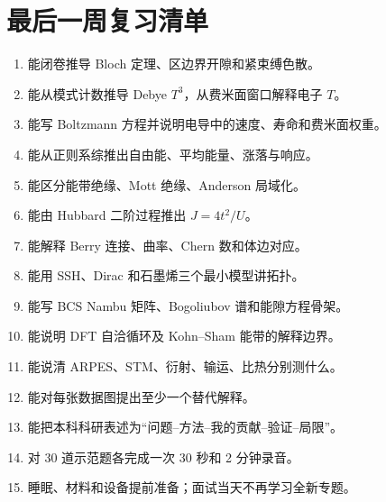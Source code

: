\chapter{最后一周复习清单}
\begin{enumerate}
\item 能闭卷推导 Bloch 定理、区边界开隙和紧束缚色散。
\item 能从模式计数推导 Debye $T^3$，从费米面窗口解释电子 $T$。
\item 能写 Boltzmann 方程并说明电导中的速度、寿命和费米面权重。
\item 能从正则系综推出自由能、平均能量、涨落与响应。
\item 能区分能带绝缘、Mott 绝缘、Anderson 局域化。
\item 能由 Hubbard 二阶过程推出 $J=4t^2/U$。
\item 能解释 Berry 连接、曲率、Chern 数和体边对应。
\item 能用 SSH、Dirac 和石墨烯三个最小模型讲拓扑。
\item 能写 BCS Nambu 矩阵、Bogoliubov 谱和能隙方程骨架。
\item 能说明 DFT 自洽循环及 Kohn--Sham 能带的解释边界。
\item 能说清 ARPES、STM、衍射、输运、比热分别测什么。
\item 能对每张数据图提出至少一个替代解释。
\item 能把本科科研表述为“问题--方法--我的贡献--验证--局限”。
\item 对 30 道示范题各完成一次 30 秒和 2 分钟录音。
\item 睡眠、材料和设备提前准备；面试当天不再学习全新专题。
\end{enumerate}

